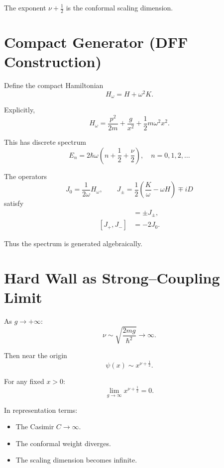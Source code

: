 \documentclass[11pt,a4paper]{article}
\begin{document}
The exponent $\nu+\frac{1}{2}$ is the conformal scaling dimension.

\section{Compact Generator (DFF Construction)}

Define the compact Hamiltonian
\begin{equation}
H_\omega = H+\omega^2 K.
\end{equation}

Explicitly,
\begin{equation}
H_\omega
=
\frac{p^2}{2m}
+
\frac{g}{x^2}
+
\frac{1}{2} m\omega^2 x^2.
\end{equation}

This has discrete spectrum
\begin{equation}
E_n
=
2\hbar\omega
\left(
n+\frac{1}{2}+\frac{\nu}{2}
\right),
\quad n=0,1,2,\dots
\end{equation}

The operators
\begin{equation}
J_0=\frac{1}{2\omega}H_\omega,
\qquad
J_\pm
=
\frac{1}{2}\left(\frac{K}{\omega}-\omega H\right)
\mp iD
\end{equation}
satisfy
\begin{align}
[J_0,J_\pm]&=\pm J_\pm,\\
[J_+,J_-]&=-2J_0.
\end{align}

Thus the spectrum is generated algebraically.

\section{Hard Wall as Strong–Coupling Limit}

As $g\to+\infty$:
\begin{equation}
\nu\sim \sqrt{\frac{2mg}{\hbar^2}}\to\infty.
\end{equation}

Then near the origin
\begin{equation}
\psi(x)\sim x^{\nu+\frac{1}{2}}.
\end{equation}

For any fixed $x>0$:
\begin{equation}
\lim_{g\to\infty} x^{\nu+\frac{1}{2}}=0.
\end{equation}

In representation terms:
\begin{itemize}
\item The Casimir $C\to\infty$.
\item The conformal weight diverges.
\item The scaling dimension becomes infinite.
\end{itemize}
\end{document}
